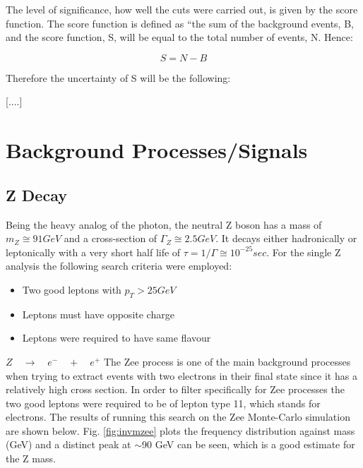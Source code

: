 \documentclass[runningheads,a4paper]{llncs}
\begin{document}
The level of significance, how well the cuts were carried out, is given by the score function. The score function is defined as “the sum of the background events, B, and the score function, S, will be equal to the total number of events, N. Hence:

\begin{equation}
S = N - B
\end{equation}

Therefore the uncertainty of S will be the following:

[....]


\section{Background Processes/Signals}

\subsection{Z Decay}

Being the heavy analog of the photon, the neutral Z boson has a mass of $m_{Z}\cong91 GeV$ and a cross-section of $\Gamma_{Z}\cong2.5 GeV$. It decays either hadronically or leptonically with a very short half life of $\tau = 1/\Gamma\cong{ 10 }^{ -25 }sec$.\linebreak
\linebreak
For the single Z analysis the following search criteria were employed:
\begin{itemize}
\item Two good leptons with ${p}_{T} > 25 GeV$
\item Leptons must have opposite charge
\item Leptons were required to have same flavour
\end{itemize}
\bigbreak

\textbf{$Z \quad \rightarrow \quad { e }^{ - } \quad + \quad { e }^{ + }$}
\smallbreak
The Zee process is one of the main background processes when trying to extract events with two electrons in their final state since it has a relatively high cross section. In order to filter specifically for Zee processes the two good leptons were required to be of lepton type 11, which stands for electrons. The results of running this search on the Zee Monte-Carlo simulation are shown below. Fig. \ref{fig:invmzee} plots the frequency distribution against mass (GeV) and a distinct peak at $\sim$90 GeV can be seen, which is a good estimate for the Z mass.
\end{document}

